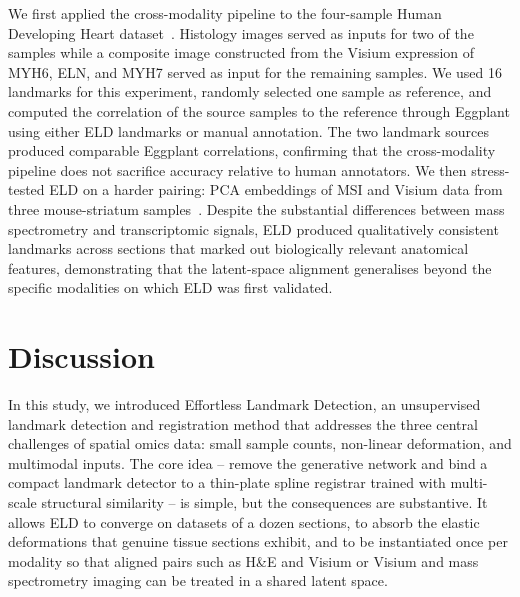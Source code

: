 \documentclass[11pt]{article}
\begin{document}
We first applied the cross-modality pipeline to the four-sample Human Developing Heart dataset~\cite{asp2019spatiotemporal}. Histology images served as inputs for two of the samples while a composite image constructed from the Visium expression of MYH6, ELN, and MYH7 served as input for the remaining samples. We used 16 landmarks for this experiment, randomly selected one sample as reference, and computed the correlation of the source samples to the reference through Eggplant using either ELD landmarks or manual annotation. The two landmark sources produced comparable Eggplant correlations, confirming that the cross-modality pipeline does not sacrifice accuracy relative to human annotators. We then stress-tested ELD on a harder pairing: PCA embeddings of MSI and Visium data from three mouse-striatum samples~\cite{vicari2024spatial}. Despite the substantial differences between mass spectrometry and transcriptomic signals, ELD produced qualitatively consistent landmarks across sections that marked out biologically relevant anatomical features, demonstrating that the latent-space alignment generalises beyond the specific modalities on which ELD was first validated.

\section{Discussion}

In this study, we introduced Effortless Landmark Detection, an unsupervised landmark detection and registration method that addresses the three central challenges of spatial omics data: small sample counts, non-linear deformation, and multimodal inputs. The core idea -- remove the generative network and bind a compact landmark detector to a thin-plate spline registrar trained with multi-scale structural similarity -- is simple, but the consequences are substantive. It allows ELD to converge on datasets of a dozen sections, to absorb the elastic deformations that genuine tissue sections exhibit, and to be instantiated once per modality so that aligned pairs such as H\&E and Visium or Visium and mass spectrometry imaging can be treated in a shared latent space.
\end{document}
